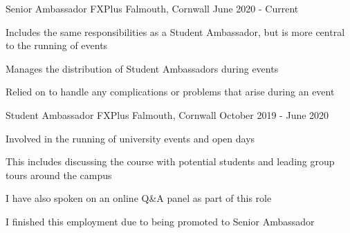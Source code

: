 

\begin{cventries}
    \cventry
        {Senior Ambassador}
        {FXPlus}
        {Falmouth, Cornwall}
        {June 2020 - Current}
        {
            \begin{cvitems}
                \item Includes the same responsibilities as a Student Ambassador, but is more central to the running of events
                \item Manages the distribution of Student Ambassadors during events
                \item Relied on to handle any complications or problems that arise during an event
            \end{cvitems}
        }

    \cventry
        {Student Ambassador}
        {FXPlus}
        {Falmouth, Cornwall}
        {October 2019 - June 2020}
        {
            \begin{cvitems}
                \item Involved in the running of university events and open days
                \item This includes discussing the course with potential students and leading group tours around the campus
                \item I have also spoken on an online Q\&A panel as part of this role
                \item I finished this employment due to being promoted to Senior Ambassador
            \end{cvitems}
        }     
\end{cventries}

